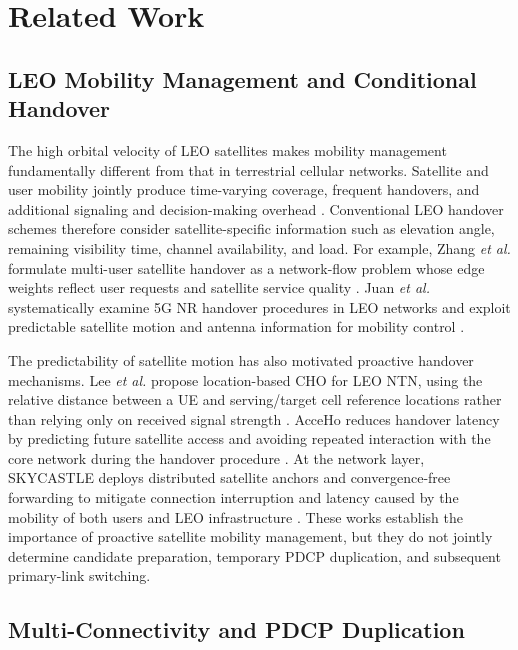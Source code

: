 \documentclass[journal]{IEEEtran}
\begin{document}
\section{Related Work}
\label{sec:related}

\subsection{LEO Mobility Management and Conditional Handover}

The high orbital velocity of LEO satellites makes mobility management
fundamentally different from that in terrestrial cellular networks.
Satellite and user mobility jointly produce time-varying coverage,
frequent handovers, and additional signaling and decision-making
overhead \cite{ji2021mobility}. Conventional LEO handover schemes
therefore consider satellite-specific information such as elevation
angle, remaining visibility time, channel availability, and load.
For example, Zhang \emph{et al.} formulate multi-user satellite
handover as a network-flow problem whose edge weights reflect user
requests and satellite service quality
\cite{zhang2021networkflow}. Juan \emph{et al.} systematically examine
5G NR handover procedures in LEO networks and exploit predictable
satellite motion and antenna information for mobility control
\cite{juan2022handover}.

The predictability of satellite motion has also motivated proactive
handover mechanisms. Lee \emph{et al.} propose location-based CHO for
LEO NTN, using the relative distance between a UE and serving/target
cell reference locations rather than relying only on received signal
strength \cite{lee2023locationcho}. AcceHo reduces handover latency by
predicting future satellite access and avoiding repeated interaction
with the core network during the handover procedure
\cite{wu2024acceho}. At the network layer, SKYCASTLE deploys
distributed satellite anchors and convergence-free forwarding to
mitigate connection interruption and latency caused by the mobility of
both users and LEO infrastructure \cite{li2024skycastle}. These works
establish the importance of proactive satellite mobility management,
but they do not jointly determine candidate preparation, temporary
PDCP duplication, and subsequent primary-link switching.

\subsection{Multi-Connectivity and PDCP Duplication}
\end{document}
